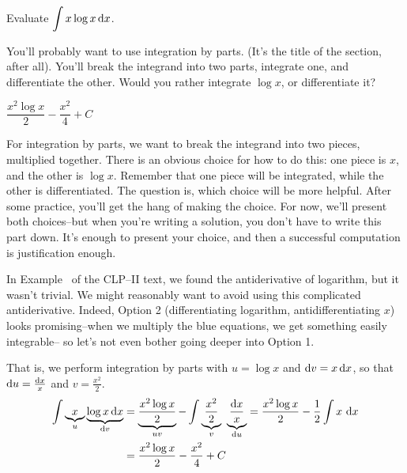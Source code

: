 \begin{Mquestion}[M121 2014A]\label{1.7_xlogx}
Evaluate ${\displaystyle\int x\log x\,\mathrm{d}x}$.
\end{Mquestion}

\begin{hint}
You'll probably want to use integration by parts. (It's the title of the section, after all). You'll break the integrand into two parts, integrate one, and differentiate the other. Would you rather integrate $\log x$, or differentiate it?
\end{hint}

\begin{answer}
$\dfrac{x^2\log x}{2} - \dfrac{x^2}{4} + C$
\end{answer}

\begin{solution}
For integration by parts, we want to break the integrand into two pieces, multiplied together. There is an obvious choice for how to do this: one piece is $x$, and the other is $\log x$. Remember that one piece will be integrated, while the other is differentiated. The question is, which choice will be more helpful. After some practice, you'll get the hang of making the choice. For now, we'll present both choices--but when you're writing a solution, you don't have to write this part down. It's enough to present your choice, and then a successful computation is justification enough.


In Example~ of the CLP--II text, we found the antiderivative of logarithm, but it wasn't trivial. We might reasonably want to avoid using this complicated antiderivative. Indeed,  Option 2 (differentiating logarithm, antidifferentiating $x$) looks promising--when we multiply the blue equations, we get something easily integrable-- so let's not even bother going deeper into Option 1.

That is, we perform integration by parts with $u=\log x$ and $\mathrm{d}v=x\,\mathrm{d}x$,
so that $\mathrm{d}u=\frac{\mathrm{d}x}{x}$ and $v = \frac{x^2}{2}$.
\begin{align*}
\int\underbrace{ x}_{u}\underbrace{\log x\,\mathrm{d}x}_{\mathrm{d}v}
   &= \underbrace{\frac{x^2\log x}{2}}_{uv} - \int \underbrace{\frac{x^2}{2}}_v\ \underbrace{\frac{\mathrm{d}x}{x}}_{\mathrm{d}u}
    = \frac{x^2\log x}{2} -\frac{1}{2} \int x \ \mathrm{d}x \\
   &= \frac{x^2\log x}{2} - \frac{x^2}{4} + C
\end{align*}
\end{solution}

